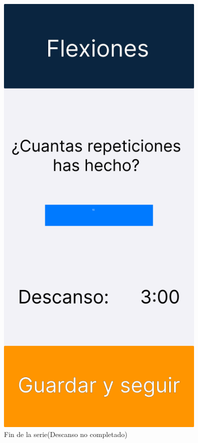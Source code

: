 \begin{figure}[H]
\begin{minipage}{0.45\textwidth}
      \label{fig:Realizando flexiones}
   \end{minipage}%
   \hspace{0.5cm}
   \begin{minipage}{0.45\textwidth}
      \centering
      \includegraphics[width=0.9\textwidth]{fotos/Frame 4.png}
      \caption{Fin de la serie(Descanso no completado)}
      \label{fig:Fin de la serie(Descanso no completado)}
   \end{minipage}
\end{figure}

